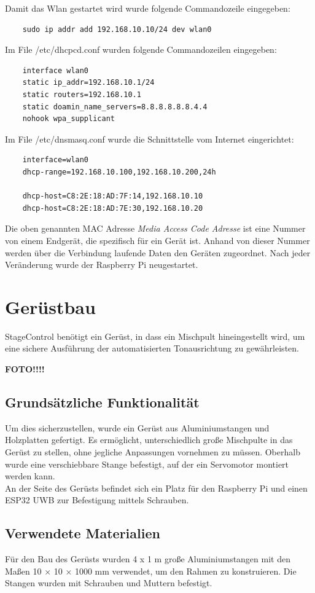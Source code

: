 Damit das Wlan gestartet wird wurde folgende Commandozeile eingegeben: 
\begin{lstlisting}
	sudo ip addr add 192.168.10.10/24 dev wlan0 
\end{lstlisting}

Im File /etc/dhcpcd.conf wurden folgende Commandozeilen eingegeben: 
\begin{lstlisting}
	interface wlan0
	static ip_addr=192.168.10.1/24
	static routers=192.168.10.1
	static doamin_name_servers=8.8.8.8.8.8.4.4
	nohook wpa_supplicant
\end{lstlisting}

Im File /etc/dnsmasq.conf wurde die Schnittstelle vom Internet eingerichtet:
\begin{lstlisting}
	interface=wlan0
	dhcp-range=192.168.10.100,192.168.10.200,24h
	
	dhcp-host=C8:2E:18:AD:7F:14,192.168.10.10
	dhcp-host=C8:2E:18:AD:7E:30,192.168.10.20
\end{lstlisting} 

Die oben genannten MAC Adresse \textit{Media Access Code Adresse} ist eine Nummer von einem Endgerät, die spezifisch für ein Gerät ist. Anhand von dieser Nummer werden über die Verbindung laufende Daten den Geräten zugeordnet. Nach jeder Veränderung wurde der Raspberry Pi neugestartet. 


\section{Gerüstbau}
StageControl benötigt ein Gerüst, in dass ein Mischpult hineingestellt wird, um eine sichere Ausführung der automatisierten Tonausrichtung zu gewährleisten. 


\textbf{FOTO!!!!}


\subsection{Grundsätzliche Funktionalität}
Um dies sicherzustellen, wurde ein Gerüst aus Aluminiumstangen und Holzplatten gefertigt. Es ermöglicht, unterschiedlich große Mischpulte in das Gerüst zu stellen, ohne jegliche Anpassungen vornehmen zu müssen. Oberhalb wurde eine verschiebbare Stange befestigt, auf der ein Servomotor montiert werden kann.\\
An der Seite des Gerüsts befindet sich ein Platz für den Raspberry Pi und einen ESP32 UWB zur Befestigung mittels Schrauben.


\subsection{Verwendete Materialien}
Für den Bau des Gerüsts wurden 4 x 1 m große Aluminiumstangen mit den Maßen 10 × 10 × 1000 mm verwendet, um den Rahmen zu konstruieren. Die Stangen wurden mit Schrauben und Muttern befestigt.\\

